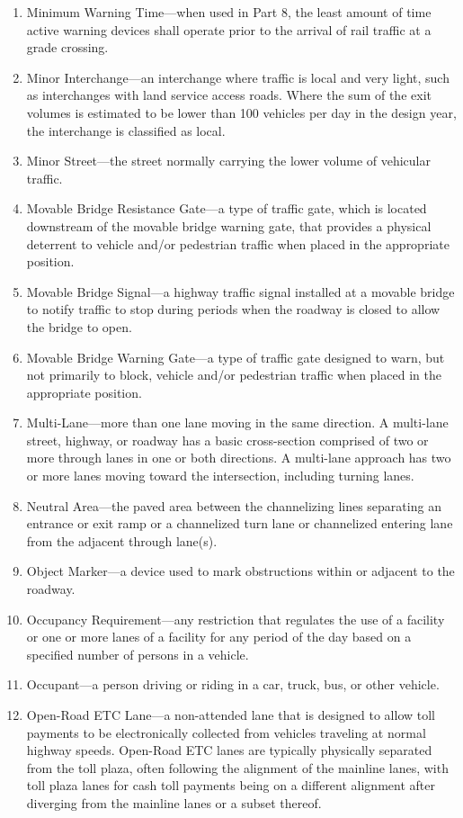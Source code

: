 \documentclass[9pt]{memoir}
\begin{document}
{\begin{enumerate}[label=\arabic*., ref=\arabic*]
\item Minimum Warning Time---when used in Part 8, the least amount of time active warning devices shall operate prior to the arrival of rail traffic at a grade crossing.
\item Minor Interchange---an interchange where traffic is local and very light, such as interchanges with land service access roads. Where the sum of the exit volumes is estimated to be lower than 100 vehicles per day in the design year, the interchange is classified as local.
\item Minor Street---the street normally carrying the lower volume of vehicular traffic.
\item Movable Bridge Resistance Gate---a type of traffic gate, which is located downstream of the movable bridge warning gate, that provides a physical deterrent to vehicle and/or pedestrian traffic when placed in the appropriate position.
\item Movable Bridge Signal---a highway traffic signal installed at a movable bridge to notify traffic to stop during periods when the roadway is closed to allow the bridge to open.
\item Movable Bridge Warning Gate---a type of traffic gate designed to warn, but not primarily to block, vehicle and/or pedestrian traffic when placed in the appropriate position.
\item Multi-Lane---more than one lane moving in the same direction. A multi-lane street, highway, or roadway has a basic cross-section comprised of two or more through lanes in one or both directions. A multi-lane approach has two or more lanes moving toward the intersection, including turning lanes.
\item Neutral Area---the paved area between the channelizing lines separating an entrance or exit ramp or a channelized turn lane or channelized entering lane from the adjacent through lane(s).
\item Object Marker---a device used to mark obstructions within or adjacent to the roadway.
\item Occupancy Requirement---any restriction that regulates the use of a facility or one or more lanes of a facility for any period of the day based on a specified number of persons in a vehicle.
\item Occupant---a person driving or riding in a car, truck, bus, or other vehicle.
\item Open-Road ETC Lane---a non-attended lane that is designed to allow toll payments to be electronically collected from vehicles traveling at normal highway speeds. Open-Road ETC lanes are typically physically separated from the toll plaza, often following the alignment of the mainline lanes, with toll plaza lanes for cash toll payments being on a different alignment after diverging from the mainline lanes or a subset thereof.

\end{enumerate}}
\end{document}
